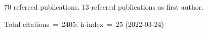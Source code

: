 70 refereed publications. 13 refeered publications as first author.

Total citations~=~2405; h-index~=~25 (2022-03-24)